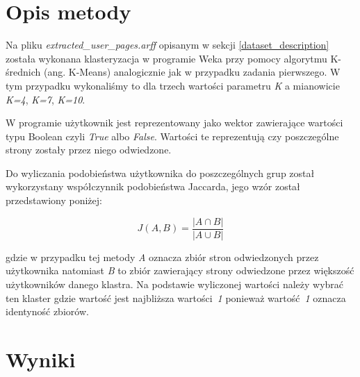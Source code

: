 \documentclass{classrep}
\begin{document}
    \section{Opis metody} {
        Na pliku \textit{extracted\_user\_pages.arff} opisanym w sekcji
        \ref{dataset_description} została wykonana klasteryzacja w programie
        Weka\cite{weka} przy pomocy algorytmu K-średnich (ang. K-Means) analogicznie
        jak w przypadku zadania pierwszego. W tym przypadku wykonaliśmy to dla trzech
        wartości parametru \emph{K} a mianowicie \emph{K=4}, \emph{K=7}, \emph{K=10}.

        W programie użytkownik jest reprezentowany jako wektor zawierające wartości
        typu Boolean czyli \emph{True} albo \emph{False}. Wartości te reprezentują czy
        poszczególne strony zostały przez niego odwiedzone.

        Do wyliczania podobieństwa użytkownika do poszczególnych grup został
        wykorzystany współczynnik podobieństwa Jaccarda, jego wzór został przedstawiony
        poniżej:

        $$
        J(A, B) = \frac{|A \cap B|}{|A \cup B|}
        $$

        gdzie w przypadku tej metody \emph{A} oznacza zbiór stron odwiedzonych przez
        użytkownika natomiast \emph{B} to zbiór zawierający strony odwiedzone przez
        większość użytkowników danego klastra. Na podstawie wyliczonej wartości należy
        wybrać ten klaster gdzie wartość jest najbliższa wartości~\emph{1} ponieważ
        wartość~\emph{1} oznacza identyność zbiorów.
    }

    \section{Wyniki}
    \label{results} {
        
    }
\end{document}

